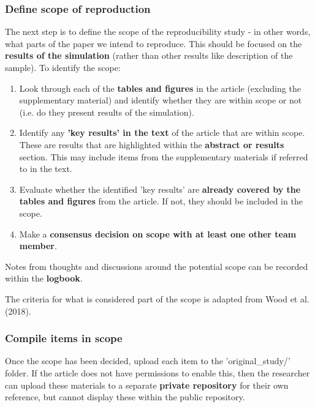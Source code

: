 \subsubsection{Define scope of reproduction}

The next step is to define the scope of the reproducibility study - in other words, what parts of the paper we intend to reproduce. This should be focused on the \textbf{results of the simulation} (rather than other results like description of the sample). To identify the scope:

\begin{enumerate}
    \item Look through each of the \textbf{tables and figures} in the article (excluding the supplementary material) and identify whether they are within scope or not (i.e. do they present results of the simulation).
    \item Identify any \textbf{'key results' in the text} of the article that are within scope. These are results that are highlighted within the \textbf{abstract or results} section. This may include items from the supplementary materials if referred to in the text.
    \item Evaluate whether the identified 'key results' are \textbf{already covered by the tables and figures} from the article. If not, they should be included in the scope.
    \item Make a \textbf{consensus decision on scope with at least one other team member}.
\end{enumerate}

Notes from thoughts and discussions around the potential scope can be recorded within the \textbf{logbook}.

The criteria for what is considered part of the scope is adapted from Wood et al. (2018).\autocite{wood_replication_2018, wood_push_2018}

\vspace{0.5cm}
\subsubsection{Compile items in scope}

Once the scope has been decided, upload each item to the 'original\_study/' folder. If the article does not have permissions to enable this, then the researcher can upload these materials to a separate \textbf{private repository} for their own reference, but cannot display these within the public repository.

